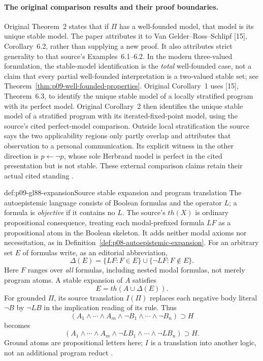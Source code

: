\paragraph{The original comparison results and their proof boundaries.}
Original Theorem~2 states that if \(\Pi\) has a well-founded model, that
model is its unique stable model.  The paper attributes it to
Van Gelder--Ross--Schlipf [15], Corollary~6.2, rather than supplying a new
proof.  It also attributes strict generality to that source's Examples~6.1--6.2.
In the modern three-valued formulation, the stable-model identification is
the \emph{total} well-founded case, not a claim that every partial
well-founded interpretation is a two-valued stable set; see
Theorem~\ref{thm:p09-well-founded-properties}.
Original Corollary~1 uses [15], Theorem~6.3, to identify the unique stable
model of a locally stratified program with its perfect model.
Original Corollary~2 then identifies the unique stable model of a stratified
program with its iterated-fixed-point model, using the source's cited
perfect-model comparison.  Outside local stratification the source says the
two applicability regions only partly overlap and attributes that observation
to a personal communication.  Its explicit witness in the other direction is
\(p\leftarrow\neg p\), whose sole Herbrand model is perfect in the cited
presentation but is not stable.  These external comparison claims retain
their actual cited standing \cite[\S4, Theorem~2, Corollaries~1--2,
pp.~7--8]{GelfondLifschitz1988}.

\begin{hbdefinition}{def:p09-gl88-expansion}{Source stable expansion and program translation}
The autoepistemic language consists of Boolean formulas and the operator
\(L\); a formula is \emph{objective} if it contains no \(L\).
The source's \(th(X)\) is ordinary propositional consequence, treating each
modal-prefixed formula \(LF\) as a propositional atom in the Boolean
skeleton.  It adds neither modal axioms nor necessitation, as in
Definition~\ref{def:p08-autoepistemic-expansion}.
For an arbitrary set \(E\) of formulas write, as an editorial abbreviation,
\[
 \Delta(E)=\{LF:F\in E\}\cup\{\neg LF:F\notin E\}.
\]
Here \(F\) ranges over \emph{all} formulas, including nested modal formulas,
not merely program atoms.  A stable expansion of \(A\) satisfies
\[
 E=th(A\cup\Delta(E)).
\]
For grounded \(\Pi\), its source translation \(I(\Pi)\) replaces each
negative body literal \(\neg B\) by \(\neg LB\) in the implication
reading of its rule.  Thus
\[
 (A_1\land\cdots\land A_m\land
       \neg B_1\land\cdots\land\neg B_n)\supset H
\]
becomes
\[
 (A_1\land\cdots\land A_m\land
       \neg LB_1\land\cdots\land\neg LB_n)\supset H.
\]
Ground atoms are propositional letters here; \(I\) is a translation into
another logic, not an additional program reduct
\cite[\S4, p.~8]{GelfondLifschitz1988}.
\end{hbdefinition}

